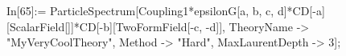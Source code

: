 In[65]:= ParticleSpectrum[Coupling1*epsilonG[a, b, c, d]*CD[-a][ScalarField[]]*CD[-b][TwoFormField[-c, -d]], TheoryName -> "MyVeryCoolTheory", Method -> "Hard", MaxLaurentDepth -> 3]; 
